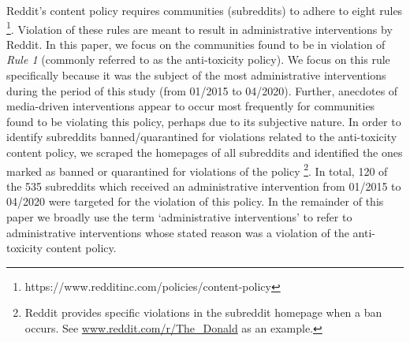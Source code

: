  Reddit's content policy
requires communities (\ie subreddits) to adhere to eight rules
\footnote{https://www.redditinc.com/policies/content-policy}. Violation of
these rules are meant to result in administrative interventions by Reddit. In
this paper, we focus on the communities found to be in violation of \emph{Rule
1} (commonly referred to as the anti-toxicity policy). We focus on this rule
specifically because it was the subject of the most administrative
interventions during the period of this study (from 01/2015 to 04/2020).
Further, anecdotes of media-driven interventions appear to occur most
frequently for communities found to be violating this policy, perhaps due to
its subjective nature. In order to identify subreddits banned/quarantined for violations
related to the anti-toxicity content policy, we scraped the homepages of all
subreddits and identified the ones marked as banned or quarantined for
violations of the policy \footnote{Reddit provides specific violations in the
subreddit homepage when a ban occurs. See \url{www.reddit.com/r/The\_Donald} as
an example.}. In total, 120 of the 535 subreddits which received an
administrative intervention from 01/2015 to 04/2020 were targeted for the
violation of this policy. In the remainder of this paper we broadly use the
term `administrative interventions' to refer to administrative interventions
whose stated reason was a violation of the anti-toxicity content policy.

